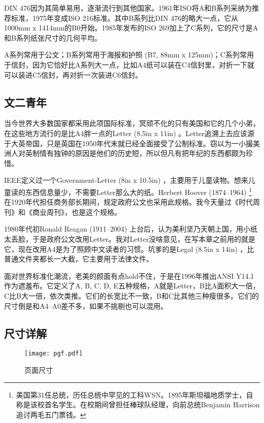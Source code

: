DIN 476因为其简单易用，逐渐流行到其他国家。1961年ISO将A和B系列采纳为推荐标准，1975年变成ISO 216标准。其中B系列比DIN 476的略大一点，它从1000mm x 1414mm的B0开始。1985年发布的ISO 269加上了C系列，它的尺寸是A和B系列纸张尺寸的几何平均。

A系列常用于公文；B系列常用于海报和护照 (B7, 88mm x 125mm)；C系列常用于信封，因为它恰好比A系列大一点，比如A4纸可以装在C4信封里，对折一下就可以装进C5信封，再对折一次装进C6信封。

\subsection{文二青年}

当今世界大多数国家都采用此项国际标准，冥顽不化的只有美国和它的几个小弟，在这些地方流行的是比A4胖一点的Letter (8.5in x 11in) 。Letter追溯上去应该源于大英帝国，只是英国在1950年代末就已经全面接受了公制标准。窃以为一小撮美洲人对英制情有独钟的原因是他们的历史短，所以但凡有把年纪的东西都颇为珍惜。

IEEE定义过一个Government-Letter (8in x 10.5in) ，主要用于儿童读物。想来儿童读的东西信息量少，不需要Letter那么大的纸。Herbert Hoover (1874--1964) \footnote{美国第31任总统，历任总统中罕见的工科WSN。1895年斯坦福地质学士，自称是该校首名学生。在校期间曾担任棒球队经理，向前总统Benjamin Harrison追讨两毛五门票钱。} 在1920年代担任商务部长期间，规定政府公文也采用此规格。我今天量过《时代周刊》和《商业周刊》，也是这个规格。

1980年代初Ronald Reagan (1911--2004) 上台后，认为美利坚乃天朝上国，用小纸太丢脸，于是政府公文改用Letter。我对Letter没啥意见，在写本章之前用的就是它，现在改用A4是为了照顾中文读者的习惯。坑爹的是Legal (8.5in x 14in) ，比普通文件夹都长一大截，它主要用于法律文件。

面对世界标准化潮流，老美的颜面有点hold不住，于是在1996年推出ANSI Y14.1作为遮羞布。它定义了A, B, C, D, E五种规格，A就是Letter，B比A面积大一倍，C比B大一倍，依次类推。它们的长宽比不一致，B和C比其他三种瘦很多。它们的尺寸倒是和A4--A0差不多，如果不挑剔也可以混用。

\subsection{尺寸详解}

\begin{figure}[!htbp]
\centering
\texttt{[image: pgf.pdf]}
\caption{页面尺寸}
\label{fig:pagelayout}
\end{figure}

